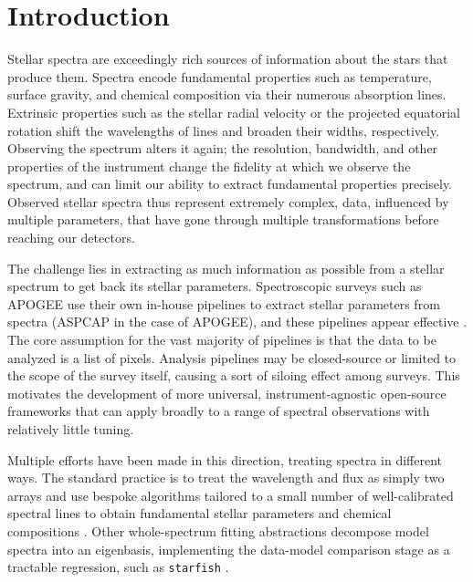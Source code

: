 \documentclass[twocolumn]{aastex631}
\begin{document}
\section{Introduction}
Stellar spectra are exceedingly rich sources of information about the stars that produce them. 
Spectra encode fundamental properties such as temperature, surface gravity, and chemical composition via their numerous absorption lines. 
Extrinsic properties such as the stellar radial velocity or the projected equatorial rotation shift the wavelengths of lines and broaden their widths, respectively. 
Observing the spectrum alters it again; the resolution, bandwidth, and other properties of the instrument change the fidelity at which we observe the spectrum, and can limit our ability to extract fundamental properties precisely.  
Observed stellar spectra thus represent extremely complex, data, influenced by multiple parameters, that have gone through multiple transformations before reaching our detectors.

The challenge lies in extracting as much information as possible from a stellar spectrum to get back its stellar parameters. 
Spectroscopic surveys such as APOGEE use their own in-house pipelines to extract stellar parameters from spectra (ASPCAP in the case of APOGEE), and these pipelines appear effective \citep{APOGEE, ASPCAP}. 
The core assumption for the vast majority of pipelines is that the data to be analyzed is a list of pixels. 
Analysis pipelines may be closed-source or limited to the scope of the survey itself, causing a sort of siloing effect among surveys. 
This motivates the development of more universal, instrument-agnostic open-source frameworks that can apply broadly to a range of spectral observations with relatively little tuning.

Multiple efforts have been made in this direction, treating spectra in different ways. 
The standard practice is to treat the wavelength and flux as simply two arrays and use bespoke algorithms tailored to a small number of well-calibrated spectral lines to obtain fundamental stellar parameters and chemical compositions \citep{pipeline1, pipeline2}. 
Other whole-spectrum fitting abstractions decompose model spectra into an eigenbasis, implementing the data-model comparison stage as a tractable regression, such as \texttt{starfish} \citep{starfish}. 
\end{document}
